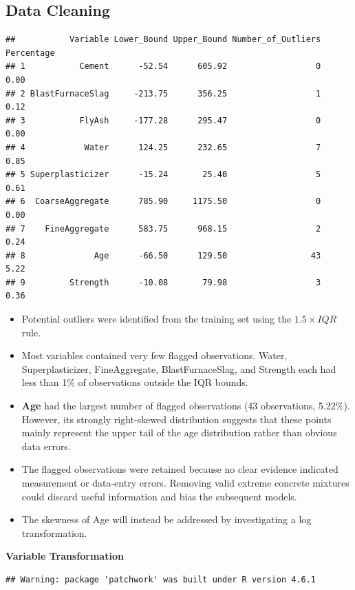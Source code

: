 \documentclass[
  11pt,
]{article}
\begin{document}
\subsection{Data Cleaning}\label{data-cleaning}

\begin{verbatim}
##           Variable Lower_Bound Upper_Bound Number_of_Outliers Percentage
## 1           Cement      -52.54      605.92                  0       0.00
## 2 BlastFurnaceSlag     -213.75      356.25                  1       0.12
## 3           FlyAsh     -177.28      295.47                  0       0.00
## 4            Water      124.25      232.65                  7       0.85
## 5 Superplasticizer      -15.24       25.40                  5       0.61
## 6  CoarseAggregate      785.90     1175.50                  0       0.00
## 7    FineAggregate      583.75      968.15                  2       0.24
## 8              Age      -66.50      129.50                 43       5.22
## 9         Strength      -10.08       79.98                  3       0.36
\end{verbatim}

\begin{itemize}
\item
  Potential outliers were identified from the training set using the
  \(1.5\times IQR\) rule.
\item
  Most variables contained very few flagged observations. Water,
  Superplasticizer, FineAggregate, BlastFurnaceSlag, and Strength each
  had less than 1\% of observations outside the IQR bounds.
\item
  \textbf{Age} had the largest number of flagged observations (43
  observations, 5.22\%). However, its strongly right-skewed distribution
  suggests that these points mainly represent the upper tail of the age
  distribution rather than obvious data errors.
\item
  The flagged observations were retained because no clear evidence
  indicated measurement or data-entry errors. Removing valid extreme
  concrete mixtures could discard useful information and bias the
  subsequent models.
\item
  The skewness of Age will instead be addressed by investigating a log
  transformation.
\end{itemize}

\textbf{Variable Transformation}

\begin{verbatim}
## Warning: package 'patchwork' was built under R version 4.6.1
\end{verbatim}
\end{document}
